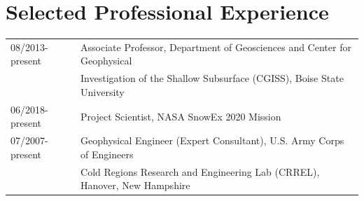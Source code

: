 \documentclass[11pt]{article}
\begin{document}
\section*{Selected Professional Experience}
\begin{tabular}{ll}
08/2013-present & Associate Professor, Department of Geosciences and Center for Geophysical \\
&   Investigation of the Shallow Subsurface (CGISS), Boise State University \\
06/2018-present & Project Scientist, NASA SnowEx 2020 Mission \\
07/2007-present & Geophysical Engineer (Expert Consultant), U.S. Army Corps of Engineers \\
& Cold Regions Research and Engineering Lab (CRREL), Hanover, New Hampshire \\
\end{tabular}

\end{document}
